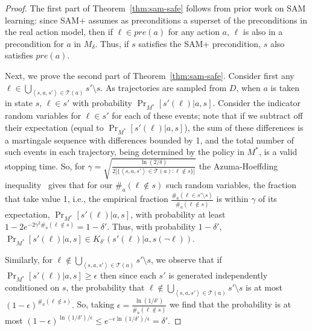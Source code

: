 \documentclass[letterpaper]{article} %
\newcommand{\pre}{\textit{pre}}
\newcommand{\tuple}[1]{\ensuremath{\left \langle #1 \right \rangle }}
\begin{document}
\begin{proof}
The first part of Theorem~\ref{thm:sam-safe} follows from prior work on SAM learning: since SAM+ assumes as preconditions a superset of the preconditions in the real action model, then if $\ell\in\pre(a)$ for any action $a$, $\ell$ is also in a precondition for $a$ in $M_\delta$. %
Thus, if $s$ satisfies the SAM+ precondition, $s$ also satisfies $\pre(a)$.

Next, we prove the second part of Theorem~\ref{thm:sam-safe}. 
Consider first any $\ell\in\bigcup_{\tuple{s, a, s'}\in \mathcal{T}(a)} s'\setminus s $. 
As trajectories are sampled from $D$, when $a$ is taken in state $s$, $\ell\in s'$ with probability $\Pr_{M^*}[s'(\ell)|a,s]$. 
Consider the indicator random variables for $\ell\in s'$ for each of these events; note that if we subtract off their expectation (equal to $\Pr_{M^*}[s'(\ell)|a,s]$), the sum of these differences is a martingale sequence with differences bounded by 1, and the total number of such events in each trajectory, being determined by the policy in $M^*$, is a valid stopping time. 
So, for 
$
\gamma = \sqrt{\frac{\ln(2/\delta)}{2|\{\tuple{s, a, s'}\in \mathcal{T}(a):\ell\notin s\}|}}
$
the Azuma-Hoeffding inequality~\cite{azuma1967,hoeffding1963probability} gives that for our 
$\#_a(\ell\notin s)$ 
such random variables, the fraction that take value 1, i.e., the empirical fraction
$
\frac{\#_a(\ell\in s'\setminus s)}{\#_a(\ell \notin s)}
$
is within $\gamma$ of its expectation, $\Pr_{M^*}[s'(\ell)|a,s]$, with probability at least %
$1-2e^{-2\gamma^2\#_a(\ell \notin s)}=1-\delta'$. 
Thus, with probability $1-\delta'$, $\Pr_{M^*}[s'(\ell)|a,s]\in K_{\delta'}(s'(\ell)|a,s(\neg\ell))$. 

Similarly, for $\ell\notin\bigcup_{\tuple{s, a, s'}\in \mathcal{T}(a)} s'\setminus s$, we observe that if 
$\Pr_{M^*}[s'(\ell)|a,s]\geq \epsilon$
then since each $s'$ is generated independently conditioned on $s$, the probability that $\ell\notin\bigcup_{\tuple{s, a, s'}\in \mathcal{T}(a)} s'\setminus s$ is at most
$
(1-\epsilon)^{\#_a(\ell\notin s)}.
$
So, taking
$
\epsilon = \frac{\ln(1/\delta')}{\#_a(\ell\notin s)}
$
we find that the probability is at most
$
(1-\epsilon)^{\ln(1/\delta')/\epsilon}
\leq e^{-\epsilon \ln(1/\delta')/\epsilon}
=\delta'.
$ 


\end{proof}
\end{document}
